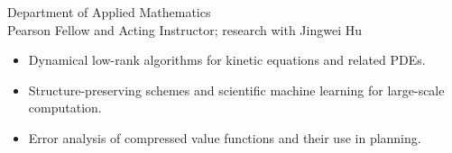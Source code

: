 Department of Applied Mathematics\\
Pearson Fellow and Acting Instructor; research with Jingwei Hu
\begin{itemize}
  \item Dynamical low-rank algorithms for kinetic equations and related PDEs.
  \item Structure-preserving schemes and scientific machine learning for large-scale computation.
  \item Error analysis of compressed value functions and their use in planning.
\end{itemize}
